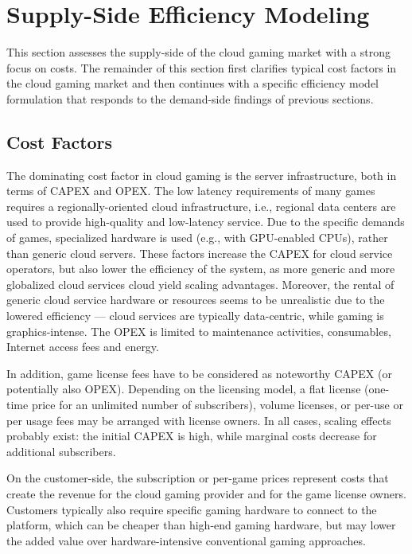 \section{Supply-Side Efficiency Modeling} %
\label{sec:suppliermodelling}

This section assesses the supply-side of the cloud gaming market with a strong focus on costs. The remainder of this section first clarifies typical cost factors in the cloud gaming market and then continues with a specific efficiency model formulation that responds to the demand-side findings of previous sections.


\subsection{Cost Factors}

The dominating cost factor in cloud gaming is the server infrastructure, both in terms of \gls{CAPEX} and \gls{OPEX}. The low latency requirements of many games requires a regionally-oriented cloud infrastructure, i.e., regional data centers are used to provide high-quality and low-latency service. Due to the specific demands of games, specialized hardware is used (e.g., with GPU-enabled CPUs), rather than generic cloud servers. These factors increase the \gls{CAPEX} for cloud service operators, but also lower the efficiency of the system, as more generic and more globalized cloud services cloud yield scaling advantages. Moreover, the rental of generic cloud service hardware or resources seems to be unrealistic due to the lowered efficiency --- cloud services are typically data-centric, while gaming is graphics-intense. The \gls{OPEX} is limited to maintenance activities, consumables, Internet access fees and energy.

In addition, game license fees have to be considered as noteworthy \gls{CAPEX} (or potentially also \gls{OPEX}). Depending on the licensing model, a flat license (one-time price for an unlimited number of subscribers), volume licenses, or per-use or per usage fees may be arranged with license owners. In all cases, scaling effects probably exist: the initial \gls{CAPEX} is high, while marginal costs decrease for additional subscribers.

On the customer-side, the subscription or per-game prices represent costs that create the revenue for the cloud gaming provider and for the game license owners. Customers typically also require specific gaming hardware to connect to the platform, which can be cheaper than high-end gaming hardware, but may lower the added value over hardware-intensive conventional gaming approaches.


